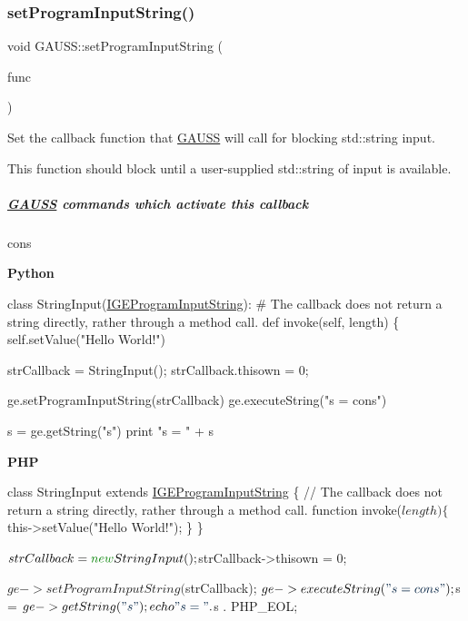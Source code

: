\subsubsection{\texorpdfstring{set\+Program\+Input\+String()}{setProgramInputString()}}
{\footnotesize\ttfamily void G\+A\+U\+S\+S\+::set\+Program\+Input\+String (\begin{DoxyParamCaption}\item[{\hyperlink{class_i_g_e_program_input_string}{I\+G\+E\+Program\+Input\+String} $\ast$}]{func }\end{DoxyParamCaption})\hspace{0.3cm}{\ttfamily [static]}}



Set the callback function that \hyperlink{class_g_a_u_s_s}{G\+A\+U\+SS} will call for blocking std\+::string input. 

This function should block until a user-\/supplied std\+::string of input is available.

\subparagraph*{\hyperlink{class_g_a_u_s_s}{G\+A\+U\+SS} commands which activate this callback}


\begin{DoxyItemize}
\item {\ttfamily cons}
\end{DoxyItemize}

{\bfseries Python} 
\begin{DoxyCode}
\textcolor{keyword}{class }StringInput(\hyperlink{class_i_g_e_program_input_string}{IGEProgramInputString}):
    \textcolor{comment}{# The callback does not return a string directly, rather through a method call.}
    \textcolor{keyword}{def }invoke(self, length) \{
        self.setValue(\textcolor{stringliteral}{"Hello World!"})

strCallback = StringInput();
strCallback.thisown = 0;

ge.setProgramInputString(strCallback)
ge.executeString(\textcolor{stringliteral}{"s = cons"})

s = ge.getString(\textcolor{stringliteral}{"s"})
\textcolor{keywordflow}{print} \textcolor{stringliteral}{"s = "} + s
\end{DoxyCode}


{\bfseries P\+HP} 
\begin{DoxyCode}
\textcolor{keyword}{class }StringInput \textcolor{keyword}{extends} \hyperlink{class_i_g_e_program_input_string}{IGEProgramInputString} \{
    \textcolor{comment}{// The callback does not return a string directly, rather through a method call.}
    \textcolor{keyword}{function} invoke($length) \{
        $this->setValue(\textcolor{stringliteral}{"Hello World!"});
    \}
\}

$strCallback = \textcolor{keyword}{new} StringInput();
$strCallback->thisown = 0;

$ge->setProgramInputString($strCallback);
$ge->executeString(\textcolor{stringliteral}{"s = cons"});

$s = $ge->getString(\textcolor{stringliteral}{"s"});
echo \textcolor{stringliteral}{"s = "} . $s . PHP\_EOL;
\end{DoxyCode}


